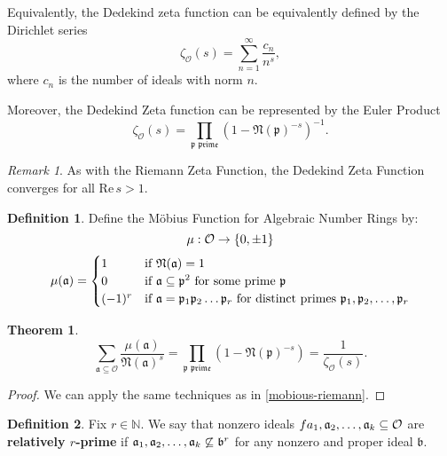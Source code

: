 \documentclass[10pt,a4paper]{article}
\newtheorem{theorem}{Theorem}[section]
\theoremstyle{definition}
\newtheorem{definition}{Definition}[section]
\theoremstyle{remark}
\newtheorem{remark}{Remark}
\newcommand{\f}[1]{\mathfrak{#1}}
\begin{document}
Equivalently, the Dedekind zeta function can be equivalently defined by the Dirichlet series
$$\zeta_\mathcal{O}(s)=\sum_{n=1}^{\infty}\frac{c_n}{n^s},$$
where \(c_n\) is the number of ideals with norm \(n\).

Moreover, the Dedekind Zeta function can be represented by the Euler Product
$$\zeta_{\mathcal{O}}(s)=\prod_{\f{p \text{ prime}}}(1-\f{N(p)}^{-s})^{-1}.$$

\begin{remark}
As with the Riemann Zeta Function, the Dedekind Zeta Function converges for all \(\text{Re} \, s>1\).
\end{remark}

	\begin{definition} Define the M\"obius Function for Algebraic Number Rings by: 
		\begin{equation}
			\mu:\mathcal{O}\to \{0,\pm 1\} \notag
		\end{equation}
		 \begin{equation}
			\mu(\f{a})=\begin{cases}
				1 & \text{if \(\f{\mathfrak{N}(a)}=1\)}\\
				0 & \text{if \(\f{a\subseteq \f{p}}^2\) for some prime \(\f{p}\) }\\
				(-1)^r & \text{if \(\f{a}=\f{p}_1 \f{p}_2\mathellipsis\f{p}_r\) for distinct primes \( \f{p}_1,\f{p}_2,\mathellipsis, \f{p}_r\)}
			\end{cases}
		\end{equation}
	\end{definition}

	\begin{theorem}
		\label{sum-to-dedekind}
		\begin{equation} 
			\sum_{\f{a\subseteq\mathcal{O}}}\frac{\mu(\f{a})}{\f{\mathfrak{N}(a)}^s} = \prod_{\f{p \text{ prime}}}(1-\f{\mathfrak{N}(p)}^{-s})=\frac{1}{\zeta_{\mathcal{O}}(s)}.		\end{equation}
	\end{theorem}
	\begin{proof}
		We can apply the same techniques as in \cref{mobious-riemann}.
	\end{proof}

	\begin{definition} Fix $r \in \mathbb{N}$. We say that nonzero ideals \(f{a}_1,\f{a}_2,\mathellipsis,\f{a}_k \subseteq \mathcal{O}\)  are \textbf{relatively \(r\)-prime} if \(\f{a}_1,\f{a}_2,\mathellipsis,\f{a}_k\not\subseteq \f{b}^r\) for any nonzero and proper ideal \(\f{b}\).
	\end{definition}
\end{document}
